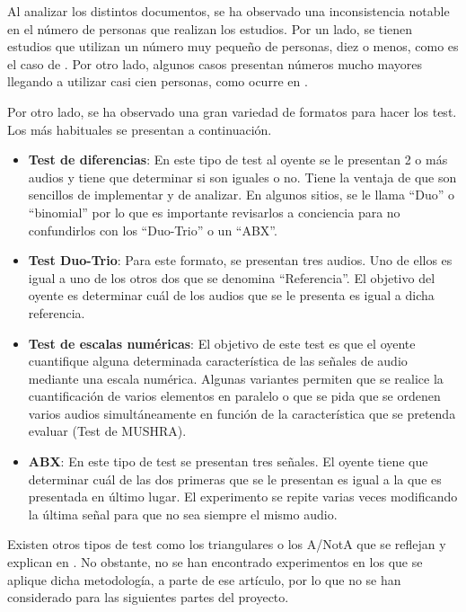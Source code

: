 \documentclass[11pt,a4paper]{book}
\begin{document}
    Al analizar los distintos documentos, se ha observado una inconsistencia notable en el número de personas que realizan los estudios. Por un lado, se tienen estudios que utilizan un número muy pequeño de personas, diez o menos, como es el caso de \cite{2019MNowak}. Por otro lado, algunos casos presentan números mucho mayores llegando a utilizar casi cien personas, como ocurre en \cite{1954JEgan}. 
    
    Por otro lado, se ha observado una gran variedad de formatos para hacer los test. Los más habituales se presentan a continuación.
    
    \begin{itemize}
        \item \textbf{Test de diferencias}: En este tipo de test al oyente se le presentan 2 o más audios y tiene que determinar si son iguales o no. Tiene la ventaja de que son sencillos de implementar y de analizar. En algunos sitios, se le llama ``Duo'' o ``binomial'' por lo que es importante revisarlos a conciencia para no confundirlos con los ``Duo-Trio'' o un ``ABX''.
        \item \textbf{Test Duo-Trio}: Para este formato, se presentan tres audios. Uno de ellos es igual a  uno de los otros dos que se denomina ``Referencia''. El objetivo del oyente es determinar cuál de los audios que se le presenta es igual a dicha referencia.
        \item \textbf{Test de escalas numéricas}: El objetivo de este test es que el oyente cuantifique alguna determinada característica de las señales de audio mediante una escala numérica. Algunas variantes permiten que se realice la cuantificación de varios elementos en paralelo o que se pida que se ordenen varios audios simultáneamente en función de la característica que se pretenda evaluar (Test de MUSHRA).
        \item \textbf{ABX}: En este tipo de test se presentan tres señales. El oyente tiene que determinar cuál de las dos primeras que se le presentan es igual a la que es presentada en último lugar. El experimento se repite varias veces modificando la última señal para que no sea siempre el mismo audio. 
    \end{itemize}
    Existen otros tipos de test como los triangulares o los A/NotA que se reflejan y explican en \cite{delaPrida2021}. No obstante, no se han encontrado experimentos en los que se aplique dicha metodología, a parte de ese artículo, por lo que no se han considerado para las siguientes partes del proyecto.
    
\end{document}
